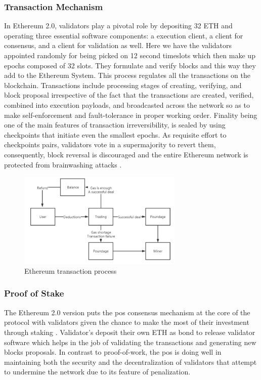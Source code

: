 \subsubsection{Transaction Mechanism}

In Ethereum 2.0, validators play a pivotal role by depositing 32 ETH and operating three essential software components: a execution client, a client for consensus, and a client for 
validation as well. Here we have the validators appointed randomly for being picked on 12 second timeslots which then make up epochs composed of 32 slots. They formulate 
and verify blocks and this way they add to the Ethereum System. This process regulates all the transactions on the blockchain. Transactions include processing stages of 
creating, verifying, and block proposal irrespective of the fact that the transactions are created, verified, combined into execution payloads, and broadcasted across 
the network so as to make self-enforcement and fault-tolerance in proper working order. Finality being one of the main features of transaction irreversibility, is 
sealed by using checkpoints that initiate even the smallest epochs. As requisite effort to checkpoints pairs, validators vote in a supermajority to revert them, 
consequently, block reversal is discouraged and the entire Ethereum network is protected from brainwashing attacks \cite{ethereumpos}.

\begin{figure}[h]  
  \centering
  \includegraphics[width=0.7\textwidth]{Images/c2_4.png} 
  \caption{Ethereum transaction process}
\end{figure}

\subsubsection{Proof of Stake}

The Ethereum 2.0 version puts the \gls{pos} consensus mechanism at the core of the protocol with validators given the chance to make the most of their 
investment through staking \cite{ethereumpos}. Validator's deposit their own ETH as bond to release validator software which helps in the job of validating the transactions and 
generating new blocks proposals. In contrast to proof-of-work, the \gls{pos} is doing well in maintaining both the security and the decentralization of validators that 
attempt to undermine the network due to its feature of penalization.


